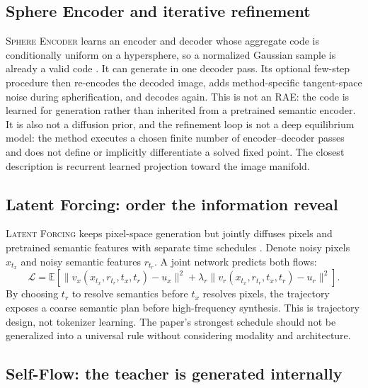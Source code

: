 \documentclass{article}
\newcommand{\E}{\mathbb{E}}
\newcommand{\method}[1]{\textsc{#1}}
\begin{document}
\subsection{Sphere Encoder and iterative refinement}

\method{Sphere Encoder} learns an encoder and decoder whose aggregate code is conditionally uniform on a hypersphere, so a normalized Gaussian sample is already a valid code \citep{yue2026sphere}. It can generate in one decoder pass. Its optional few-step procedure then re-encodes the decoded image, adds method-specific tangent-space noise during spherification, and decodes again. This is not an RAE: the code is learned for generation rather than inherited from a pretrained semantic encoder. It is also not a diffusion prior, and the refinement loop is not a deep equilibrium model: the method executes a chosen finite number of encoder--decoder passes and does not define or implicitly differentiate a solved fixed point. The closest description is recurrent learned projection toward the image manifold.

\subsection{Latent Forcing: order the information reveal}

\method{Latent Forcing} keeps pixel-space generation but jointly diffuses pixels and pretrained semantic features with separate time schedules \citep{baade2026latentforcing}. Denote noisy pixels \(x_{t_x}\) and noisy semantic features \(r_{t_r}\). A joint network predicts both flows:
\[
\mathcal{L}
=
\E\!\left[
\|v_x(x_{t_x},r_{t_r},t_x,t_r)-u_x\|^2
+
\lambda_r\|v_r(x_{t_x},r_{t_r},t_x,t_r)-u_r\|^2
\right].
\]
By choosing \(t_r\) to resolve semantics before \(t_x\) resolves pixels, the trajectory exposes a coarse semantic plan before high-frequency synthesis. This is trajectory design, not tokenizer learning. The paper's strongest schedule should not be generalized into a universal rule without considering modality and architecture.

\subsection{Self-Flow: the teacher is generated internally}
\end{document}

